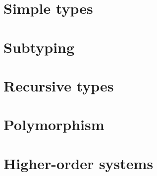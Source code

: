 \section{Simple types}

\section{Subtyping}

\section{Recursive types}

\section{Polymorphism}

\section{Higher-order systems}